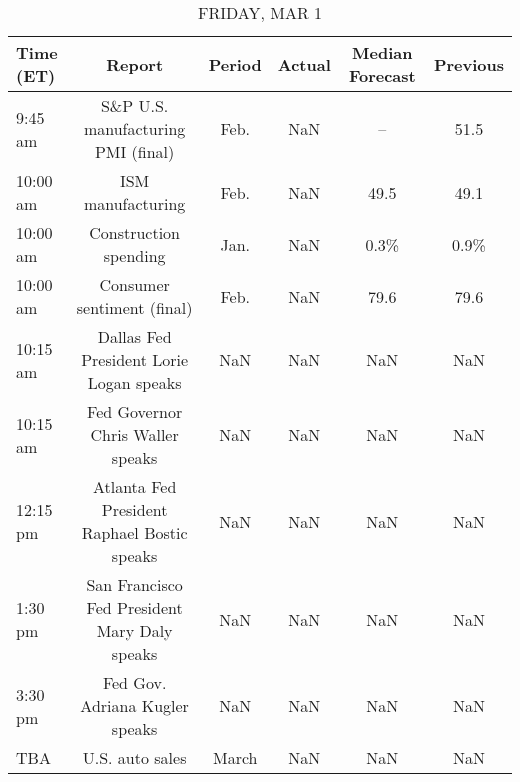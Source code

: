 \documentclass{article}%
\begin{document}
%


\begin{table}[htbp]%
\caption{FRIDAY, MAR 1}%
\centering%
\begin{adjustbox}{width=1\textwidth}%
\begin{tabular}{lccccc}
\toprule
Time (ET) &                                       Report & Period & Actual & Median Forecast & Previous \\
\midrule
  9:45 am &           S\&P U.S. manufacturing PMI (final) &   Feb. &    NaN &              -- &     51.5 \\
 10:00 am &                            ISM manufacturing &   Feb. &    NaN &            49.5 &     49.1 \\
 10:00 am &                        Construction spending &   Jan. &    NaN &            0.3\% &     0.9\% \\
 10:00 am &                   Consumer sentiment (final) &   Feb. &    NaN &            79.6 &     79.6 \\
 10:15 am &      Dallas Fed President Lorie Logan speaks &    NaN &    NaN &             NaN &      NaN \\
 10:15 am &             Fed Governor Chris Waller speaks &    NaN &    NaN &             NaN &      NaN \\
 12:15 pm &  Atlanta Fed President Raphael Bostic speaks &    NaN &    NaN &             NaN &      NaN \\
  1:30 pm & San Francisco Fed President Mary Daly speaks &    NaN &    NaN &             NaN &      NaN \\
  3:30 pm &               Fed Gov. Adriana Kugler speaks &    NaN &    NaN &             NaN &      NaN \\
      TBA &                              U.S. auto sales &  March &    NaN &             NaN &      NaN \\
\bottomrule
\end{tabular}
%
\end{adjustbox}%
\end{table}
\end{document}
